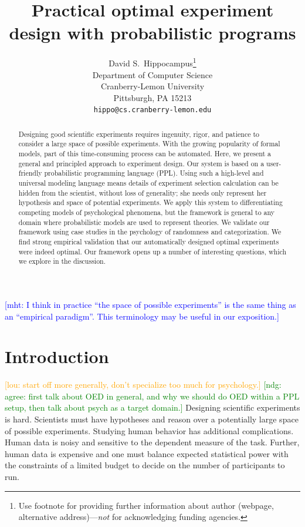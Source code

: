 \documentclass{article}
\title{Practical optimal experiment design with probabilistic programs}
\author{
  David S.~Hippocampus\thanks{Use footnote for providing further
    information about author (webpage, alternative
    address)---\emph{not} for acknowledging funding agencies.} \\
  Department of Computer Science\\
  Cranberry-Lemon University\\
  Pittsburgh, PA 15213 \\
  \texttt{hippo@cs.cranberry-lemon.edu} \\
}
\newcommand{\ndg}[1]{\textcolor{Green}{[ndg: #1]}}
\newcommand{\mht}[1]{\textcolor{Blue}{[mht: #1]}}
\newcommand{\lou}[1]{\textcolor{orange}{[lou: #1]}}
\begin{document}

\maketitle

\begin{abstract}

Designing good scientific experiments requires ingenuity, rigor, and patience to consider a large space of possible experiments.
With the growing popularity of formal models, part of this time-consuming process can be automated.
Here, we present a general and principled approach to experiment design.
Our system is based on a user-friendly probabilistic programming language (PPL).
Using such a high-level and universal modeling language means details of experiment selection calculation can be hidden from the scientist, without loss of generality; she needs only represent her hypothesis and space of potential experiments.
We apply this system to differentiating competing models of psychological phenomena, but the framework is general to any domain where probabilistic models are used to represent theories.
We validate our framework using case studies in the psychology of randomness and categorization.
We find strong empirical validation that our automatically designed optimal experiments were indeed optimal.
Our framework opens up a number of interesting questions, which we explore in the discussion.


\end{abstract}

\mht{I think in practice ``the space of possible experiments'' is the same thing as an ``empirical paradigm''. This terminology may be useful in our exposition.}

\section{Introduction}
\lou{start off more generally, don't specialize too much for psychology.}
\ndg{agree: first talk about OED in general, and why we should do OED within a PPL setup, then talk about psych as a target domain.}
Designing scientific experiments is hard.
Scientists must have hypotheses and reason over a potentially large space of possible experiments.
Studying human behavior has additional complications.
Human data is noisy and sensitive to the dependent measure of the task.
Further, human data is expensive and one must balance expected statistical power with the constraints of a limited budget to decide on the number of participants to run.
\end{document}
